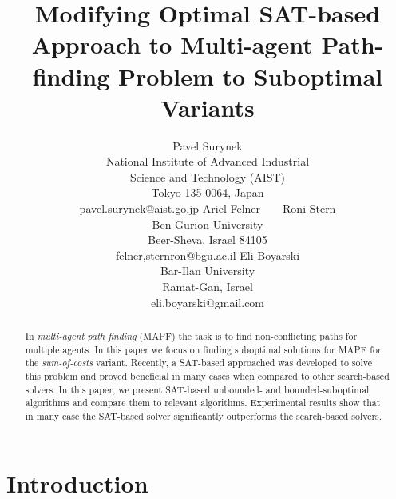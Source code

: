 \documentclass[letterpaper]{article}
\begin{document}
\title{Modifying Optimal SAT-based Approach to Multi-agent Path-finding Problem to Suboptimal Variants}

\author{Pavel Surynek\\
National Institute of Advanced Industrial\\
Science and Technology (AIST)\\
Tokyo 135-0064, Japan\\
pavel.surynek@aist.go.jp
\And
Ariel Felner~~~~Roni Stern\\
Ben Gurion University\\
Beer-Sheva, Israel 84105\\
felner,sternron@bgu.ac.il
\And
Eli Boyarski\\
Bar-Ilan University\\
Ramat-Gan, Israel\\
eli.boyarski@gmail.com
}

\maketitle
\begin{small}
\begin{abstract}
In {\em multi-agent path finding} (MAPF) the task is to find
non-conflicting paths for multiple agents. In this paper we focus on finding
suboptimal solutions for MAPF for the {\em sum-of-costs} variant.
Recently, a SAT-based approached was developed to solve this problem and proved
beneficial in many cases when compared to other search-based solvers. In this
paper, we present SAT-based unbounded- and bounded-suboptimal algorithms and
compare them to relevant algorithms. Experimental results show that in many
case the SAT-based solver significantly outperforms the search-based solvers.

\end{abstract}
\end{small}

\section{Introduction}
\noindent \noindent

\end{document}
